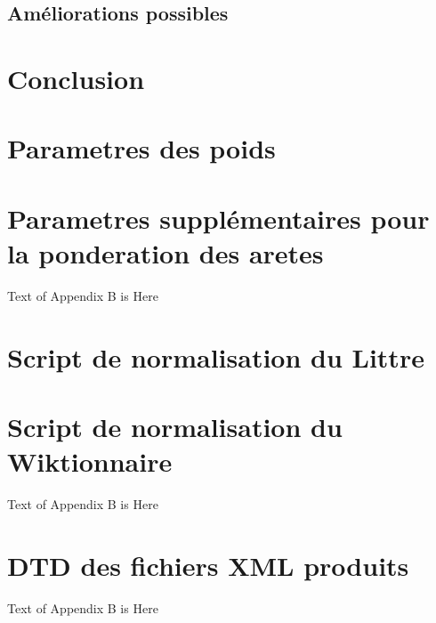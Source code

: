 \documentclass[a4paper, 12pt]{article}
\begin{document}
\subsection{Améliorations possibles}

\section{Conclusion}


\appendix
\section{Parametres des poids}\label{App:weights}
%

\section{Parametres supplémentaires pour la ponderation des aretes}\label{App:otherparams}
Text of Appendix B is Here

\section{Script de normalisation du Littre}\label{App:normlittre}
%

\section{Script de normalisation du Wiktionnaire}\label{App:normwiki}
Text of Appendix B is Here

\section{DTD des fichiers XML produits}\label{App:dtddico}
Text of Appendix B is Here
\end{document}
